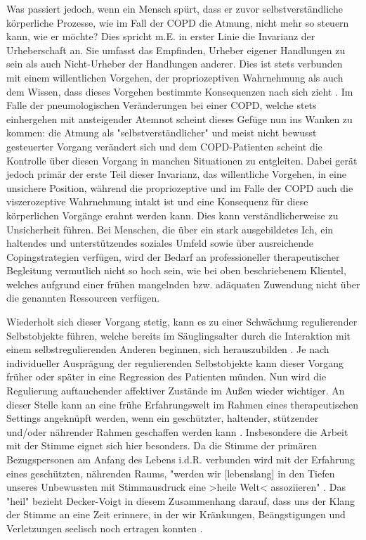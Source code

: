 Was passiert jedoch, wenn ein Mensch spürt, dass er zuvor selbstverständliche körperliche Prozesse, wie im Fall der COPD die Atmung, nicht mehr so steuern kann, wie er möchte? Dies spricht m.E. in erster Linie die Invarianz der Urheberschaft an. Sie umfasst das Empfinden, Urheber eigener Handlungen zu sein als auch Nicht-Urheber der Handlungen anderer. Dies ist stets verbunden mit einem willentlichen Vorgehen, der propriozeptiven Wahrnehmung als auch dem Wissen, dass dieses Vorgehen bestimmte Konsequenzen nach sich zieht \autocite[vgl.][106, 114f.]{stern2007}. Im Falle der pneumologischen Veränderungen bei einer COPD, welche stets einhergehen mit ansteigender Atemnot scheint dieses Gefüge nun ins Wanken zu kommen: die Atmung als "selbstverständlicher" und meist nicht bewusst gesteuerter Vorgang verändert sich und dem COPD-Patienten scheint die Kontrolle über diesen Vorgang in manchen Situationen zu entgleiten. Dabei gerät jedoch primär der erste Teil dieser Invarianz, das willentliche Vorgehen, in eine unsichere Position, während die propriozeptive und im Falle der COPD auch die viszerozeptive Wahrnehmung intakt ist und eine Konsequenz für diese körperlichen Vorgänge erahnt werden kann. Dies kann verständlicherweise zu Unsicherheit führen. Bei Menschen, die über ein stark ausgebildetes Ich, ein haltendes und unterstützendes soziales Umfeld sowie über ausreichende Copingstrategien verfügen, wird der Bedarf an professioneller therapeutischer Begleitung vermutlich nicht so hoch sein, wie bei oben beschriebenem Klientel, welches aufgrund einer frühen mangelnden bzw. adäquaten Zuwendung nicht über die genannten Ressourcen verfügen. 

Wiederholt sich dieser Vorgang stetig, kann es zu einer Schwächung regulierender Selbstobjekte führen, welche bereits im Säuglingsalter durch die Interaktion mit einem selbstregulierenden Anderen beginnen, sich herauszubilden \autocite[vgl.][338f.]{stern2007}. Je nach individueller Ausprägung der regulierenden Selbstobjekte kann dieser Vorgang früher oder später in eine Regression des Patienten münden. Nun wird die Regulierung auftauchender affektiver Zustände im Außen wieder wichtiger. 
An dieser Stelle kann an eine frühe Erfahrungswelt im Rahmen eines therapeutischen Settings angeknüpft werden, wenn ein geschützter, haltender, stützender und/oder nährender Rahmen geschaffen werden kann \autocite[vgl.][58ff.]{timmermann2008}. Insbesondere die Arbeit mit der Stimme eignet sich hier besonders. Da die Stimme der primären Bezugspersonen am Anfang des Lebens i.d.R. verbunden wird mit der Erfahrung eines geschützten, nährenden Raums, "werden wir [lebenslang] in den Tiefen unseres Unbewussten mit Stimmausdruck eine >heile Welt< assoziieren" \autocite[282]{deckervoigt2000}. Das "heil" bezieht Decker-Voigt in diesem Zusammenhang darauf, dass uns der Klang der Stimme an eine Zeit erinnere, in der wir Kränkungen, Beängstigungen und Verletzungen seelisch noch ertragen konnten \autocite[vgl.][282]{deckervoigt2000}. 

